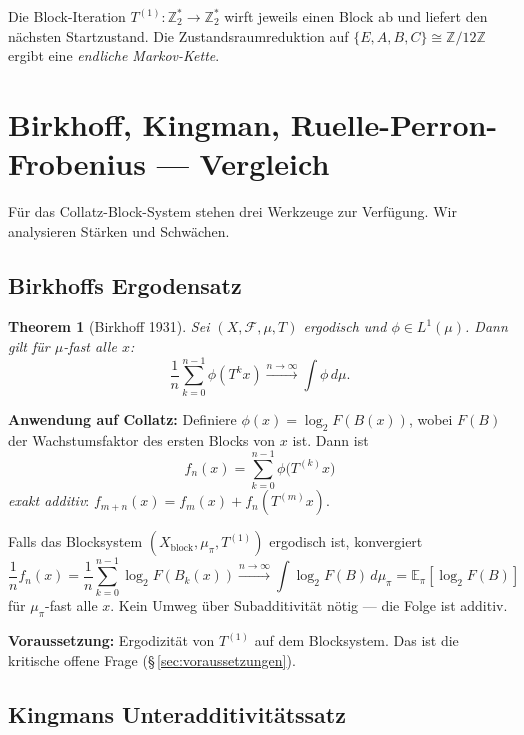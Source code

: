 \documentclass[12pt,a4paper]{article}
\newtheorem{theorem}[definition]{Theorem}
\newcommand{\Z}{\mathbb{Z}}
\newcommand{\Ztwo}{\mathbb{Z}_2}
\newcommand{\Epi}{\mathbb{E}_\pi}
\begin{document}
Die Block-Iteration $T^{(1)}: \Ztwo^* \to \Ztwo^*$ wirft jeweils einen
Block ab und liefert den nächsten Startzustand. Die Zustandsraumreduktion
auf $\{E, A, B, C\} \cong \Z/12\Z$ ergibt eine \emph{endliche Markov-Kette}.

\section{Birkhoff, Kingman, Ruelle-Perron-Frobenius — Vergleich}
\label{sec:vergleich}

Für das Collatz-Block-System stehen drei Werkzeuge zur Verfügung.
Wir analysieren Stärken und Schwächen.

\subsection{Birkhoffs Ergodensatz}

\begin{theorem}[Birkhoff 1931]
Sei $(X, \mathcal{F}, \mu, T)$ ergodisch und $\phi \in L^1(\mu)$.
Dann gilt für $\mu$-fast alle $x$:
\[
  \frac{1}{n}\sum_{k=0}^{n-1}\phi(T^k x) \xrightarrow{n\to\infty} \int \phi \,d\mu.
\]
\end{theorem}

\textbf{Anwendung auf Collatz:} Definiere $\phi(x) = \log_2 F(B(x))$, wobei
$F(B)$ der Wachstumsfaktor des ersten Blocks von $x$ ist. Dann ist
\[
  f_n(x) = \sum_{k=0}^{n-1} \phi\bigl(T^{(k)}x\bigr)
\]
\emph{exakt additiv}: $f_{m+n}(x) = f_m(x) + f_n(T^{(m)} x)$.

\begin{tcolorbox}[ergebnis, title={Birkhoff ist \emph{direkt} anwendbar}]
Falls das Blocksystem $(X_{\mathrm{block}}, \mu_\pi, T^{(1)})$ ergodisch ist,
konvergiert
\[
  \frac{1}{n} f_n(x) = \frac{1}{n}\sum_{k=0}^{n-1}\log_2 F(B_k(x))
  \xrightarrow{n\to\infty} \int \log_2 F(B)\,d\mu_\pi = \Epi[\log_2 F(B)]
\]
für $\mu_\pi$-fast alle $x$. Kein Umweg über Subadditivität nötig ---
die Folge ist additiv.
\end{tcolorbox}

\textbf{Voraussetzung:} Ergodizität von $T^{(1)}$ auf dem Blocksystem.
Das ist die kritische offene Frage (§\,\ref{sec:voraussetzungen}).

\subsection{Kingmans Unteradditivitätssatz}
\end{document}

